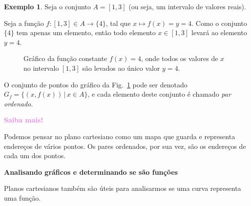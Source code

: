 \documentclass[12pt,openright,twoside,a4paper]{article}
\theoremstyle{definition}
\newtheorem{example}{Exemplo}[section]
\begin{document}
	\begin{example}
		Seja o conjunto $A = [1,3]$ (ou seja, um intervalo de valores reais).
		
		Seja a função $f: [1,3] \in A \longrightarrow \{4\}$, tal que $x \mapsto f(x) = y = 4$. Como o conjunto $\{4\}$ tem apenas um elemento, então todo elemento $x \in [1,3]$ levará ao elemento $y=4$.
		
		\begin{figure}[h]
			\centering
			\caption{Gráfico da função constante $f(x) = 4$, onde todos os valores de $x$ no intervalo $[1,3]$ são levados ao único valor $y = 4$.}
			\label{fig:funcao_constante_no_plano}
		\end{figure}
		
		O conjunto de pontos do gráfico da Fig.~\ref{fig:funcao_constante_no_plano} pode ser denotado $G_f = \{ (x, f(x)) \,|\, x \in A\}$, e cada elemento deste conjunto é chamado \textit{par ordenado}.
	\end{example}
	
	\begin{snugshade}
		\textbf{\textcolor{violet}{Saiba mais!}}
		
		Podemos pensar no plano cartesiano como um mapa que guarda e representa endereços de vários pontos. Os pares ordenados, por sua vez, são os endereços de cada um dos pontos.
	\end{snugshade}
	
	\textbf{Analisando gráficos e determinando se são funções}
	
	Planos cartesianos também são úteis para analisarmos se uma curva representa uma função.
	
\end{document}
